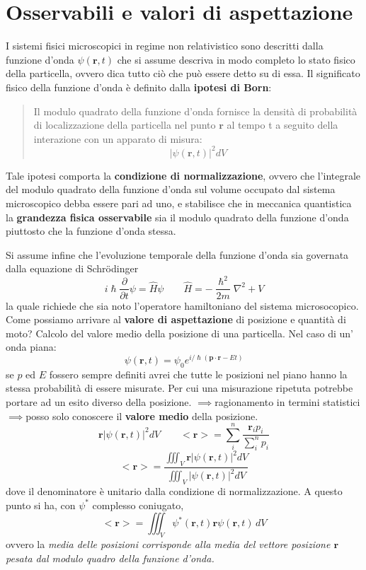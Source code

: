 
\section{Osservabili e valori di aspettazione}\label{sec:osservabili-e-valori-di-aspettazione}

I sistemi fisici microscopici in regime non relativistico sono descritti
dalla funzione d'onda \(\psi(\bm{r},t)\) che si assume descriva in modo
completo lo stato fisico della particella, ovvero dica tutto ciò che può
essere detto su di essa.
Il significato fisico della funzione d'onda è
definito dalla \textbf{ipotesi di Born}:
\begin{quote}
    Il modulo quadrato della funzione d'onda fornisce la densità di probabilità
    di localizzazione della particella nel punto \(\bm{r}\) al tempo t a seguito
    della interazione con un apparato di misura:
    \[
        | \psi(\bm{r},t)|^{2}dV
    \]
\end{quote}
Tale ipotesi comporta la \textbf{condizione di normalizzazione},
ovvero che l'integrale del modulo quadrato della funzione d'onda sul
volume occupato dal sistema microscopico debba essere pari ad uno, e
stabilisce che in meccanica quantistica la \textbf{grandezza fisica osservabile}
sia il modulo quadrato della funzione d'onda piuttosto che la funzione d'onda stessa.

Si assume infine che l'evoluzione temporale della funzione d'onda sia
governata dalla equazione di Schrödinger
\[
    i \hslash \frac{\partial}{\partial t} \psi = \hat{H} \psi \qquad \hat{H} = - \frac{\hslash^{2}}{2m} \nabla^{2} + V
\]
la quale richiede che sia noto l'operatore hamiltoniano del sistema microsocopico.
Come possiamo arrivare al \textbf{valore di aspettazione} di
posizione e quantità di moto?
Calcolo del valore medio della posizione
di una particella.
Nel caso di un' onda piana: \[
                                \psi(\bm{r},t) = \psi_{0} e^{ i/\hslash (\bm{p} \cdot \bm{r}-Et) }
\] se \(p\) ed \(E\) fossero sempre definiti avrei che tutte le
posizioni nel piano hanno la stessa probabilità di essere misurate.
Per
cui una misurazione ripetuta potrebbe portare ad un esito diverso della
posizione. \(\implies\)ragionamento in termini
statistici\(\implies\)posso solo conoscere il \textbf{valore medio}
della posizione. \[
                     \bm{r} |\psi(\bm{r},t)|^{2}dV \qquad <\bm{r}> = \sum_{i}^{n} \frac{\bm{r}_{i}p_{i}}{\sum_{i}^{n}p_{i}}
\]
\begin{equation}
    <\bm{r}> = \frac{\iiint_{V} \bm{r} |\psi(\bm{r},t)|^{2}dV }{\iiint_{V}|\psi(\bm{r},t)|^{2}dV }
    \label{eq:mean-value-quantum-position}
\end{equation} dove il denominatore è unitario dalla condizione di
normalizzazione.
A questo punto si ha, con \(\psi^*\) complesso
coniugato, \[
               <\bm{r}> = \iiint_{V} \psi^*(\bm{r},t)\bm{r}\psi(\bm{r},t)\,dV
\] ovvero la \emph{media delle posizioni corrisponde alla media del
vettore posizione \(\bm{r}\) pesata dal modulo quadro della funzione
d'onda.}

